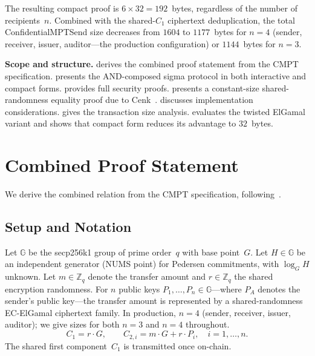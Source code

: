 \documentclass[11pt]{article}
\theoremstyle{definition}
\newcommand{\G}{\mathbb{G}}
\newcommand{\Zq}{\mathbb{Z}_q}
\begin{document}
The resulting compact proof is $6 \times 32 = 192$~bytes, regardless
of the number of recipients~$n$.
Combined with the shared-$C_1$ ciphertext deduplication,
the total \textsf{ConfidentialMPTSend} size decreases from $1604$ to
$1177$~bytes for $n = 4$ (sender, receiver, issuer, auditor---the
production configuration) or $1144$~bytes for $n = 3$.

\medskip
\noindent\textbf{Scope and structure.}
 derives the combined proof statement from the
CMPT specification.
 presents the AND-composed sigma protocol in both
interactive and compact forms.
 provides full security proofs.
 presents a constant-size shared-randomness
equality proof due to Cenk~\cite{Cenk2026unification}.
 discusses implementation considerations.
 gives the transaction size analysis.
 evaluates the twisted ElGamal variant and shows
that compact form reduces its advantage to $32$~bytes.

\section{Combined Proof Statement}
\label{sec:relation}

We derive the combined relation from the CMPT specification,
following~\cite{Cenk2026unification}.

\subsection{Setup and Notation}

Let $\G$ be the secp256k1 group of prime order~$q$ with base
point~$G$.
Let $H \in \G$ be an independent generator (NUMS point) for Pedersen
commitments, with $\log_G H$ unknown.
Let $m \in \Zq$ denote the transfer amount and
$r \in \Zq$ the shared encryption randomness.
For $n$ public keys $P_1, \ldots, P_n \in \G$---where $P_A$ denotes
the sender's public key---the transfer amount is represented by a
shared-randomness EC-ElGamal ciphertext family.
In production, $n = 4$ (sender, receiver, issuer, auditor);
we give sizes for both $n = 3$ and $n = 4$ throughout.
\[
  C_1 = r \cdot G, \qquad
  C_{2,i} = m \cdot G + r \cdot P_i, \quad i = 1, \ldots, n.
\]
The shared first component~$C_1$ is transmitted once on-chain.
\end{document}
